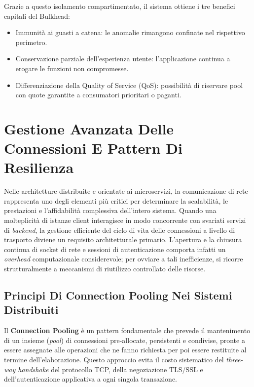 \documentclass[11pt, a4paper]{article}
\begin{document}
Grazie a questo isolamento compartimentato, il sistema ottiene i tre benefici capitali del Bulkhead:
\begin{itemize}[noitemsep]
    \item Immunità ai guasti a catena: le anomalie rimangono confinate nel rispettivo perimetro.
    \item Conservazione parziale dell'esperienza utente: l'applicazione continua a erogare le funzioni non compromesse.
    \item Differenziazione della Quality of Service (QoS): possibilità di riservare pool con quote garantite a consumatori prioritari o paganti.
\end{itemize}



\section{Gestione Avanzata Delle Connessioni E Pattern Di Resilienza}

Nelle architetture distribuite e orientate ai microservizi, la comunicazione di rete rappresenta uno degli elementi più critici per determinare la scalabilità, le prestazioni e l'affidabilità complessiva dell'intero sistema. Quando una molteplicità di istanze client interagisce in modo concorrente con svariati servizi di \emph{backend}, la gestione efficiente del ciclo di vita delle connessioni a livello di trasporto diviene un requisito architetturale primario. L'apertura e la chiusura continua di socket di rete e sessioni di autenticazione comporta infatti un \emph{overhead} computazionale considerevole; per ovviare a tali inefficienze, si ricorre strutturalmente a meccanismi di riutilizzo controllato delle risorse.

\subsection{Principi Di Connection Pooling Nei Sistemi Distribuiti}

Il \textbf{Connection Pooling} è un pattern fondamentale che prevede il mantenimento di un insieme (\emph{pool}) di connessioni pre-allocate, persistenti e condivise, pronte a essere assegnate alle operazioni che ne fanno richiesta per poi essere restituite al termine dell'elaborazione. Questo approccio evita il costo sistematico del \emph{three-way handshake} del protocollo TCP, della negoziazione TLS/SSL e dell'autenticazione applicativa a ogni singola transazione.
\end{document}
